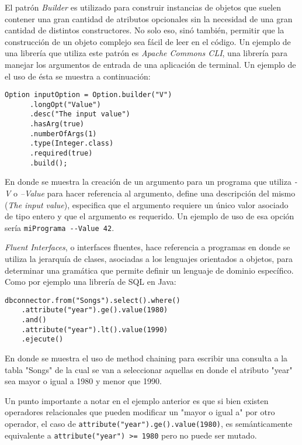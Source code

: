 El patr\'on \emph{Builder} es utilizado para construir instancias de objetos que suelen contener una gran cantidad de atributos opcionales sin la necesidad de una gran cantidad de distintos constructores. No solo eso, sin\'o tambi\'en, permitir que la construcci\'on de un objeto complejo sea f\'acil de leer en el c\'odigo. Un ejemplo de una librer\'ia que utiliza este patr\'on es \emph{Apache Commons CLI}, una librer\'ia para manejar los argumentos de entrada de una aplicaci\'on de terminal. Un ejemplo de el uso de \'esta se muestra a continuaci\'on:
\begin{center}
	\begin{lstlisting}[mathescape=true]
    Option inputOption = Option.builder("V")
      .longOpt("Value")
      .desc("The input value")
      .hasArg(true)
      .numberOfArgs(1)
      .type(Integer.class)
      .required(true)
      .build();
	\end{lstlisting}
\end{center}
En donde se muestra la creaci\'on de un argumento para un programa que utiliza \emph{-V} o \emph{--Value} para hacer referencia al argumento, define una descripci\'on del mismo (\emph{The input value}), especifica que el argumento requiere un \'unico valor asociado de tipo entero y que el argumento es requerido. Un ejemplo de uso de esa opci\'on ser\'ia \lstinline|miPrograma --Value 42|.

\emph{Fluent Interfaces}, o interfaces fluentes, hace referencia a programas en donde se utiliza la jerarqu\'ia de clases, asociadas a los lenguajes orientados a objetos, para determinar una gram\'atica que permite definir un lenguaje de dominio espec\'ifico. Como por ejemplo una librer\'ia de SQL en Java:
\begin{center}
	\begin{lstlisting}[mathescape=true]
	dbconnector.from("Songs").select().where()
	.attribute("year").ge().value(1980)
	.and()
	.attribute("year").lt().value(1990)
	.ejecute()
	\end{lstlisting}
\end{center}
En donde se muestra el uso de method chaining para escribir una consulta a la tabla "Songs" de la cual se van a seleccionar aquellas en donde el atributo "year" sea mayor o igual a 1980 y menor que 1990.

Un punto importante a notar en el ejemplo anterior es que si bien existen operadores relacionales que pueden modificar un "mayor o igual a" por otro operador, el caso de \texttt{attribute("year").ge().value(1980)}, es sem\'anticamente equivalente a \texttt{attribute("year") >= 1980} pero no puede ser mutado.

